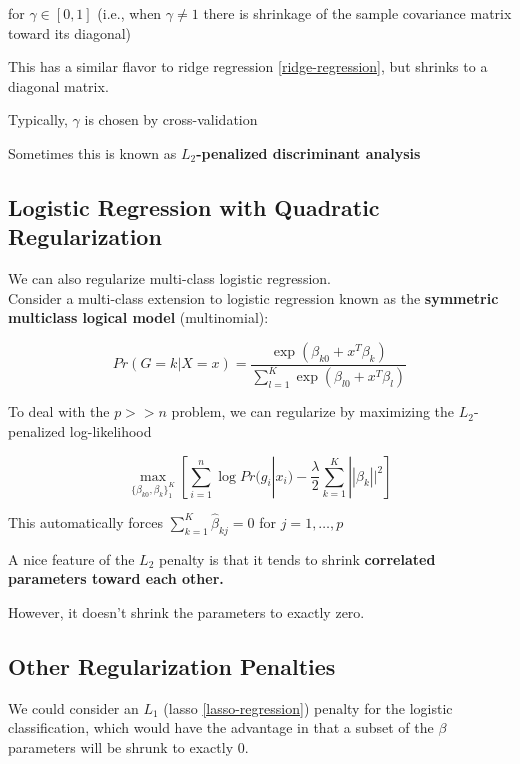 \documentclass[
]{book}
\begin{document}
for \(\gamma \in [0,1]\) (i.e., when \(\gamma \neq 1\) there is shrinkage of the sample covariance matrix toward its diagonal)

This has a similar flavor to ridge regression \ref{ridge-regression}, but shrinks to a diagonal matrix.

Typically, \(\gamma\) is chosen by cross-validation

Sometimes this is known as \(L_2\)\textbf{-penalized discriminant analysis}

\hypertarget{logistic-regression-with-quadratic-regularization}{%
\subsection{Logistic Regression with Quadratic Regularization}\label{logistic-regression-with-quadratic-regularization}}

We can also regularize multi-class logistic regression.\\
Consider a multi-class extension to logistic regression known as the \textbf{symmetric multiclass logical model} (multinomial):

\[
Pr(G = k |X=x) = \frac{\exp(\beta_{k0} + x^T \beta_k)}{\sum_{l=1}^K \exp(\beta_{l0} + x^T \beta_l)}
\]

To deal with the \(p >>n\) problem, we can regularize by maximizing the \(L_2\)-penalized log-likelihood

\[
\underset{\{\beta_{k0}, \beta_k\}_1^K}{\operatorname{max}} [ \sum_{i=1}^n \log Pr(g_i|x_i) - \frac{\lambda}{2}\sum_{k=1}^K ||\beta_k ||^2]
\]

This automatically forces \(\sum_{k=1}^K \hat{\beta}_{kj} = 0\) for \(j = 1,\dots, p\)

A nice feature of the \(L_2\) penalty is that it tends to shrink \textbf{correlated parameters toward each other.}

However, it doesn't shrink the parameters to exactly zero.

\hypertarget{other-regularization-penalties}{%
\subsection{Other Regularization Penalties}\label{other-regularization-penalties}}

We could consider an \(L_1\) (lasso \ref{lasso-regression}) penalty for the logistic classification, which would have the advantage in that a subset of the \(\beta\) parameters will be shrunk to exactly 0.
\end{document}
